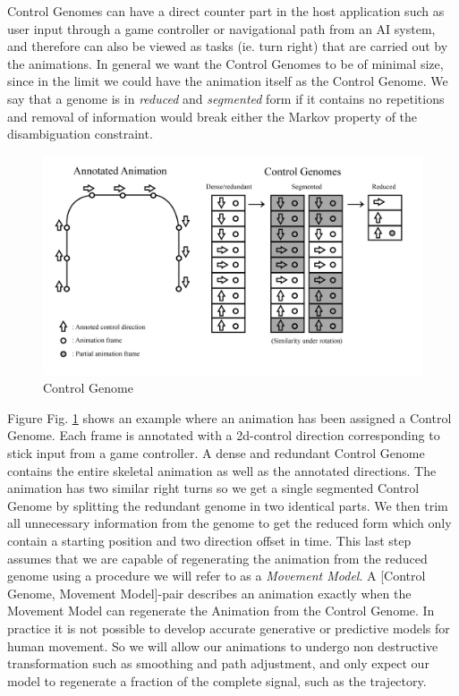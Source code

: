 Control Genomes can have a direct counter part in the host application such as user input through a game controller or navigational path from an AI system, and therefore can also be viewed as tasks (ie. turn right) that are carried out by the animations. In general we want the Control Genomes to be of minimal size, since in the limit we could have the animation itself as the Control Genome. We say that a genome is in \textit{reduced} and \textit{segmented} form if it contains no repetitions and removal of information would break either the Markov property of the disambiguation constraint. 

\begin{figure}
    \centering
    \includegraphics[width=1\columnwidth]{img/controlgenome.png}
    \caption{Control Genome}
    \label{fig:control:genome}
\end{figure}

Figure Fig. \ref{fig:control:genome} shows an example where an animation has been assigned a Control Genome. Each frame is annotated with a 2d-control direction corresponding to stick input from a game controller. A dense and redundant Control Genome contains the entire skeletal animation as well as the annotated directions. The animation has two similar right turns so we get a single segmented Control Genome by splitting the redundant genome in two identical parts. We then trim all unnecessary information from the genome to get the reduced form which only contain a starting position and two direction offset in time. This last step assumes that we are capable of regenerating the animation from the reduced genome using a procedure we will refer to as a \textit{Movement Model}. A [Control Genome, Movement Model]-pair describes an animation exactly when the Movement Model can regenerate the Animation from the Control Genome.  In practice it is not possible to develop accurate generative or predictive models for human movement. So we will allow our animations to undergo non destructive transformation such as smoothing and path adjustment, and only expect our model to regenerate a fraction of the complete signal, such as the trajectory. 

